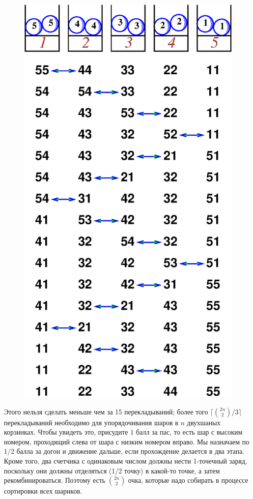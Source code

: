 \begin{figure}[h!]
\centering
\includegraphics[scale=0.5]{Figs/UnsolvedPuzzles/5bin}
\end{figure}

Этого нельзя сделать меньше чем за 15 перекладываний; более того $\lceil\binom{2n}{2}/3\rceil$ перекладываний необходимо для упорядочивания шаров в $n$ двухшаных корзинках.
Чтобы увидеть это, присудите $1$ балл за пас, то есть шар с высоким номером, проходящий слева от шара с низким номером вправо.
Мы назначаем по $1/2$ балла за догон и движение дальше, если прохождение делается в два этапа.
Кроме того, два счетчика с одинаковым числом должны нести 1-точечный заряд, поскольку они должны отделяться (1/2 точку) в какой-то точке, а затем рекомбинироваться.
Поэтому есть $\binom{2n}2$ очка, которые надо собирать в процессе сортировки всех шариков.

